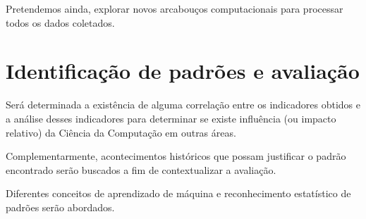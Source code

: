 Pretendemos ainda, explorar novos arcabouços computacionais para processar todos os dados coletados.

\section{Identificação de padrões e avaliação}

Será determinada a existência de alguma correlação entre os indicadores obtidos e a análise desses indicadores para determinar se existe influência (ou impacto relativo) da Ciência da Computação em outras áreas.

Complementarmente, acontecimentos históricos que possam justificar o padrão encontrado serão buscados a fim de contextualizar a avaliação.

Diferentes conceitos de aprendizado de máquina e reconhecimento estatístico de padrões serão abordados.
